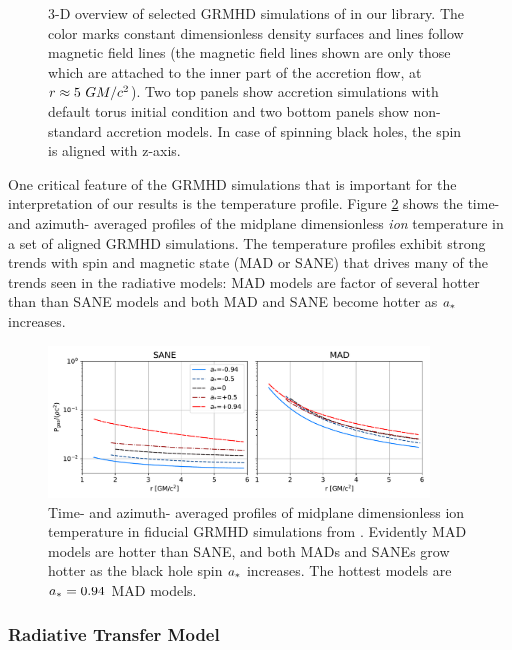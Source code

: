 \begin{figure}
  \caption{3-D overview of selected GRMHD simulations of \sgra in our library.
    The color marks constant dimensionless density surfaces and lines follow magnetic field lines (the magnetic field lines shown are only those which are attached to the inner part of the accretion flow, at $r\approx 5~GM/c^2$).
    Two top panels show accretion simulations with default torus initial condition and
    two bottom panels show non-standard accretion models. In case of spinning black holes, the spin is aligned with z-axis.}
  \label{fig:GRMHD}
\end{figure}

One critical feature of the GRMHD simulations that is important for the interpretation of our results is the temperature profile.  Figure \ref{fig:grmhd_temp} shows the time- and azimuth- averaged profiles of the midplane dimensionless {\em ion} temperature in a set of aligned GRMHD simulations.  The temperature profiles exhibit strong trends with spin and magnetic state (MAD or SANE) that drives many of the trends seen in the radiative models: MAD models are factor of several hotter than than SANE models and both MAD and SANE become hotter as $a_*$ increases.

\begin{figure}
  \centering
  \includegraphics[width=0.9\textwidth]{figures/grmhd_temp.pdf}
  \caption{Time- and azimuth- averaged profiles of midplane dimensionless ion temperature in fiducial GRMHD simulations from \kharma.  Evidently MAD models are hotter than SANE, and both MADs and SANEs grow hotter as the black hole spin $a_*$ increases.  The hottest models are $a_* = 0.94$ MAD models.}
  \label{fig:grmhd_temp}
\end{figure}

\subsubsection{Radiative Transfer Model}

